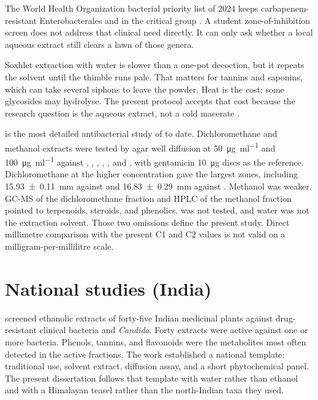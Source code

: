 The World Health Organization bacterial priority list of 2024 keeps carbapenem-resistant Enterobacterales and  in the critical group \citep{who2024bacterial}. A student zone-of-inhibition screen does not address that clinical need directly. It can only ask whether a local aqueous extract still clears a lawn of those genera.

Soxhlet extraction with water is slower than a one-pot decoction, but it repeats the solvent until the thimble runs pale. That matters for tannins and saponins, which can take several siphons to leave the powder. Heat is the cost: some glycosides may hydrolyse. The present protocol accepts that cost because the research question is the aqueous extract, not a cold macerate \citep{azwanida2015review,harbone1998phytochemical}.

\citet{drakhshaan2026identification} is the most detailed antibacterial study of  to date. Dichloromethane and methanol extracts were tested by agar well diffusion at \SI{50}{\micro\gram\per\milli\litre} and \SI{100}{\micro\gram\per\milli\litre} against , , , , , and , with gentamicin \SI{10}{\micro\gram} discs as the reference. Dichloromethane at the higher concentration gave the largest zones, including \SI{15.93 \pm 0.11}{\milli\metre} against  and \SI{16.83 \pm 0.29}{\milli\metre} against . Methanol was weaker. GC-MS of the dichloromethane fraction and HPLC of the methanol fraction pointed to terpenoids, steroids, and phenolics.  was not tested, and water was not the extraction solvent. Those two omissions define the present study. Direct millimetre comparison with the present C1 and C2 values is not valid on a milligram-per-millilitre scale.

\section{National studies (India)}

\citet{ahmad2001antimicrobial} screened ethanolic extracts of forty-five Indian medicinal plants against drug-resistant clinical bacteria and \textit{Candida}. Forty extracts were active against one or more bacteria. Phenols, tannins, and flavonoids were the metabolites most often detected in the active fractions. The work established a national template: traditional use, solvent extract, diffusion assay, and a short phytochemical panel. The present dissertation follows that template with water rather than ethanol and with a Himalayan teasel rather than the north-Indian taxa they used.

